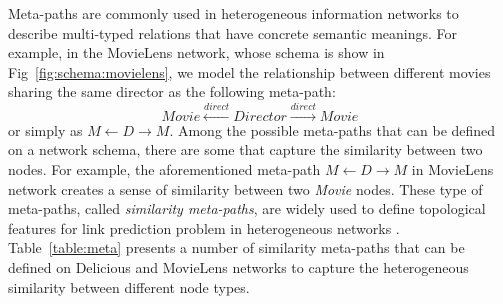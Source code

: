 Meta-paths are commonly used in heterogeneous information networks to describe multi-typed relations that have concrete semantic meanings. For example, in the MovieLens network, whose schema is show in Fig~\ref{fig:schema:movielens}, we model the relationship between different movies sharing the same director as the following meta-path:
\[Movie\xleftarrow{direct}Director\xrightarrow{direct}Movie\]
or simply as $M\leftarrow D\rightarrow M$.
Among the possible meta-paths that can be defined on a network schema, there are some that capture the similarity between two nodes. For example, the aforementioned meta-path $M\leftarrow D\rightarrow M$ in MovieLens network creates a sense of similarity between two \emph{Movie} nodes. These type of meta-paths, called \emph{similarity meta-paths}, are widely used to define topological features for link prediction problem in heterogeneous networks \cite{sun2011co, 7752228}. Table~\ref{table:meta} presents a number of similarity meta-paths that can be defined on Delicious and MovieLens networks to capture the heterogeneous similarity between different node types.

